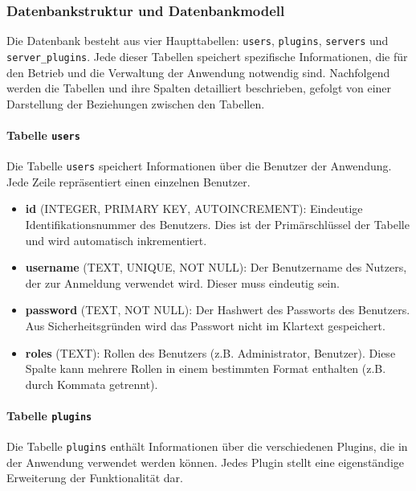 \subsubsection{Datenbankstruktur und
Datenbankmodell}\label{datenbankstruktur-und-datenbankmodell}

Die Datenbank besteht aus vier Haupttabellen: \texttt{users},
\texttt{plugins}, \texttt{servers} und \texttt{server\_plugins}. Jede
dieser Tabellen speichert spezifische Informationen, die für den Betrieb
und die Verwaltung der Anwendung notwendig sind. Nachfolgend werden die
Tabellen und ihre Spalten detailliert beschrieben, gefolgt von einer
Darstellung der Beziehungen zwischen den Tabellen.

\paragraph{\texorpdfstring{Tabelle
\texttt{users}}{Tabelle users}}\label{tabelle-users}

Die Tabelle \texttt{users} speichert Informationen über die Benutzer der
Anwendung. Jede Zeile repräsentiert einen einzelnen Benutzer.

\begin{itemize}
\item
  \textbf{id} (INTEGER, PRIMARY KEY, AUTOINCREMENT): Eindeutige
  Identifikationsnummer des Benutzers. Dies ist der Primärschlüssel der
  Tabelle und wird automatisch inkrementiert.
\item
  \textbf{username} (TEXT, UNIQUE, NOT NULL): Der Benutzername des
  Nutzers, der zur Anmeldung verwendet wird. Dieser muss eindeutig sein.
\item
  \textbf{password} (TEXT, NOT NULL): Der Hashwert des Passworts des
  Benutzers. Aus Sicherheitsgründen wird das Passwort nicht im Klartext
  gespeichert.
\item
  \textbf{roles} (TEXT): Rollen des Benutzers (z.B. Administrator,
  Benutzer). Diese Spalte kann mehrere Rollen in einem bestimmten Format
  enthalten (z.B. durch Kommata getrennt).
\end{itemize}

\paragraph{\texorpdfstring{Tabelle
\texttt{plugins}}{Tabelle plugins}}\label{tabelle-plugins}

Die Tabelle \texttt{plugins} enthält Informationen über die
verschiedenen Plugins, die in der Anwendung verwendet werden können.
Jedes Plugin stellt eine eigenständige Erweiterung der Funktionalität
dar.

